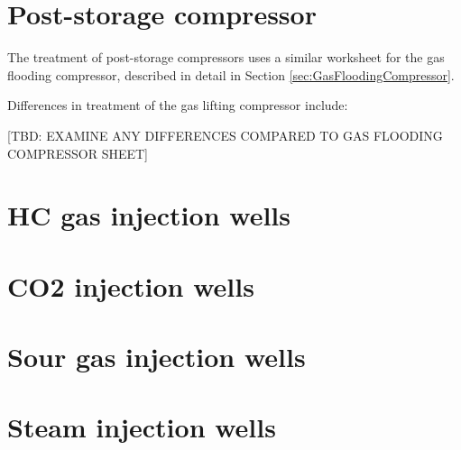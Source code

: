 \documentclass[11pt]{report}
\begin{document}
{%
\section{Post-storage compressor}
\label{sec:post_storage_compressor}

The treatment of post-storage compressors uses a similar worksheet for the gas flooding compressor, described in detail in Section \ref{sec:GasFloodingCompressor}.

Differences in treatment of the gas lifting compressor include:

[TBD: EXAMINE ANY DIFFERENCES COMPARED TO GAS FLOODING COMPRESSOR SHEET]






\clearpage

\section{HC gas injection wells}
\label{sec:hc_gas_injection_wells}





\clearpage

\section{CO2 injection wells}
\label{sec:co2_gas_injection_wells}





\clearpage

\section{Sour gas injection wells}
\label{sec:sour_gas_injection_wells}






\clearpage

\section{Steam injection wells}
\label{sec:steam_injection_wells}





\clearpage

}
\end{document}
